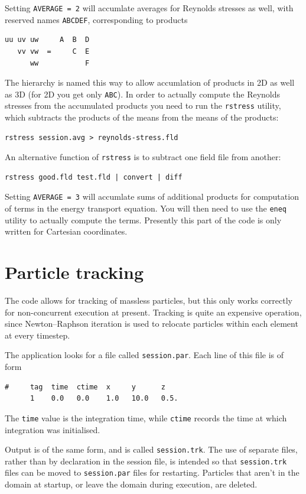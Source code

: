 \documentclass[11pt,a4paper]{report}
\begin{document}
Setting \verb+AVERAGE = 2+ will accumlate averages for Reynolds
stresses as well, with reserved names \verb+ABCDEF+, corresponding to
products
\begin{verbatim}
uu uv uw     A  B  D
   vv vw  =     C  E
      ww           F
\end{verbatim}
The hierarchy is named this way to allow accumlation of products in 2D
as well as 3D (for 2D you get only \verb+ABC+).  In order to actually
compute the Reynolds stresses from the accumulated products you need
to run the \verb+rstress+ utility, which subtracts the products of the
means from the means of the products:
\begin{verbatim}
rstress session.avg > reynolds-stress.fld
\end{verbatim}
An alternative function of \verb+rstress+ is to subtract one field
file from another:
\begin{verbatim}
rstress good.fld test.fld | convert | diff
\end{verbatim}

Setting \verb+AVERAGE = 3+ will accumlate sums of additional products
for computation of terms in the energy transport equation. You will
then need to use the \verb+eneq+ utility to actually compute the
terms. Presently this part of the code is only written for Cartesian
coordinates.


\section{Particle tracking}

The code allows for tracking of massless particles, but this only
works correctly for non-concurrent execution at present.  Tracking is
quite an expensive operation, since Newton--Raphson iteration is used
to relocate particles within each element at every timestep.

The application looks for a file called \verb+session.par+.  Each line
of this file is of form
\begin{verbatim}
#     tag  time  ctime  x     y      z
      1    0.0   0.0    1.0   10.0   0.5.
\end{verbatim}
The \verb+time+ value is the integration time, while \verb+ctime+
records the time at which integration was initialised.

Output is of the same form, and is called \verb+session.trk+.  The use
of separate files, rather than by declaration in the session file, is
intended so that \verb+session.trk+ files can be moved to
\verb+session.par+ files for restarting.  Particles that aren't in the
domain at startup, or leave the domain during execution, are deleted.
\end{document}
